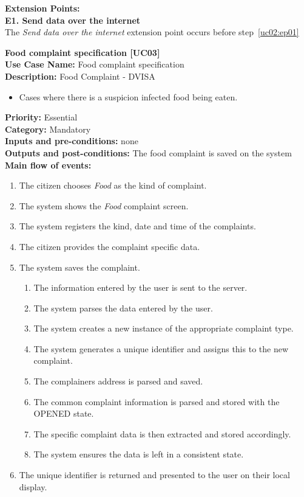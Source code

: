\documentclass[11pt,twoside]{article}
\begin{document}
\textbf{Extension Points:}\\
\textbf{E1. Send data over the internet}\\
The \textit{Send data over the internet} extension point occurs before step~\ref{uc02:ep01}


\textbf{Food complaint specification [UC03]}\\
\textbf{Use Case Name:} Food complaint specification\\
\textbf{Description:} 
Food Complaint - DVISA
\begin{itemize}
\item Cases where there is a suspicion infected food being eaten.
\end{itemize}
\textbf{Priority:} Essential\\
\textbf{Category:} Mandatory\\
\textbf{Inputs and pre-conditions:} none\\
\textbf{Outputs and post-conditions:} The food complaint is saved on the system\\
\textbf{Main flow of events:}\\
\begin{enumerate}
\item The citizen chooses \textit{Food} as the kind of complaint.
\item The system shows the \textit{Food} complaint screen.
\item The system registers the kind, date and time of the complaints.
\item The citizen provides the complaint specific data.
\item The system saves the complaint.
\begin{enumerate}
\item The information entered by the user is sent to the server.
\item The system parses the data entered by the user.
\item The system creates a new instance of the appropriate complaint
type.
\item The system generates a unique identifier and assigns this to the new
complaint.
\item The complainers address is parsed and saved.
\item The common complaint information is parsed and stored with the
OPENED state.
\item The specific complaint data is then extracted and stored accordingly.
\item The system ensures the data is left in a consistent state.
\end{enumerate}
\item The unique identifier is returned and presented to the user on their local
display.
\end{enumerate}
\end{document}
